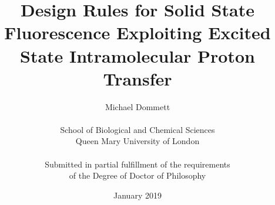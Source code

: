 \documentclass[a4paper,11.5pt]{report}
\begin{document}
\setlength{\TPHorizModule}{200mm} 
\setlength{\TPVertModule}{100mm} 
\textblockorigin{61mm}{19mm}






\providecommand{\OT}[1]{\operatorname{\Theta}\bigl(#1\bigr)}
\providecommand{\OOm}[1]{\operatorname{\Omega}\bigl(#1\bigr)}



\title{\huge
\textbf{Design Rules for Solid State Fluorescence Exploiting Excited State Intramolecular Proton Transfer}}
\author{Michael Dommett \\
\\
School of Biological and Chemical Sciences\\
Queen Mary University of London\\
\\
Submitted in partial fulfillment of the requirements\\ of the Degree of Doctor of Philosophy}

\date{January 2019}

\maketitle

  
\setcounter{page}{2}


\tableofcontents
\listoffigures
\listoftables










\appendix
\appendixpage
\setcounter{figure}{0} \renewcommand{\thefigure}{A\arabic{figure}}
\renewcommand{\thetable}{A\arabic{figure}}
\end{document}
